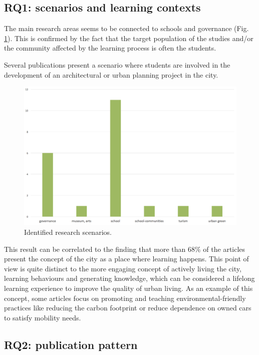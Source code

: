 \subsection*{RQ1: scenarios and learning contexts}

The main research areas seems to be connected to schools and governance (Fig. \ref{fig:scenarios}).
This is confirmed by the fact that the target population of the studies and/or the community affected by the learning process is often the students.

Several publications present a scenario where students are involved in the development of an architectural or urban planning project in the city\cite{seitamaa-hakkarainen_architecture_2012}\cite{ulrich_lets_2013}\cite{beckett_augmented_2005}.

\begin{figure}[htb]
\centering
\includegraphics[width=12cm]{img/scenario}
\caption{Identified research scenarios.}
\label{fig:scenarios}
\end{figure}

This result can be correlated to the finding that more than 68\% of the articles present the concept of the city as a place where learning happens. This point of view is quite distinct to the more engaging concept of actively living the city, learning behaviours and generating knowledge, which can be considered a lifelong learning experience to improve the quality of urban living.
As an example of this concept, some articles focus on promoting and teaching environmental-friendly practices like reducing the carbon footprint\cite{evans_give_2014} or reduce dependence on owned cars to satisfy mobility needs\cite{valle_cloud_2011}.


\subsection*{RQ2: publication pattern}

